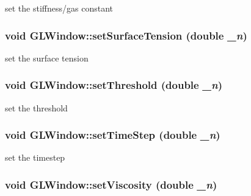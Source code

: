 set the stiffness/gas constant \hypertarget{classGLWindow_ab26e262bd95ee756d8261cc092cf8dc3}{
\subsubsection[{setSurfaceTension}]{\setlength{\rightskip}{0pt plus 5cm}void GLWindow::setSurfaceTension (double {\em \_\-n})}}
\label{classGLWindow_ab26e262bd95ee756d8261cc092cf8dc3}


set the surface tension \hypertarget{classGLWindow_ac2e41fa3623baddbead609560cf0cb17}{
\subsubsection[{setThreshold}]{\setlength{\rightskip}{0pt plus 5cm}void GLWindow::setThreshold (double {\em \_\-n})}}
\label{classGLWindow_ac2e41fa3623baddbead609560cf0cb17}


set the threshold \hypertarget{classGLWindow_a2d949af9af07c06de1b81402e6f590d4}{
\subsubsection[{setTimeStep}]{\setlength{\rightskip}{0pt plus 5cm}void GLWindow::setTimeStep (double {\em \_\-n})}}
\label{classGLWindow_a2d949af9af07c06de1b81402e6f590d4}


set the timestep \hypertarget{classGLWindow_ae22720b8f6d1bb25c4ca1dbf09bafc08}{
\subsubsection[{setViscosity}]{\setlength{\rightskip}{0pt plus 5cm}void GLWindow::setViscosity (double {\em \_\-n})}}
\label{classGLWindow_ae22720b8f6d1bb25c4ca1dbf09bafc08}


